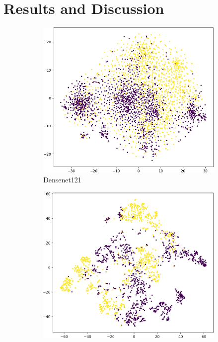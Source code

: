 \documentclass[peerreview]{IEEEtran}
\begin{document}
\section{Results and Discussion}
\begin{figure}[ht]
    \centering
    \begin{subfigure}[b]{0.3\textwidth}
        \includegraphics[width=\textwidth]{figure/Densenet121_tsne.png}
        \caption{Densenet121}
        \label{fig:tsne_densenet}
    \end{subfigure}
    \hfill
    \begin{subfigure}[b]{0.3\textwidth}
        \includegraphics[width=\textwidth]{figure/resnet50_pretrained_tsne.png}

\end{subfigure}
\end{figure}
\end{document}
